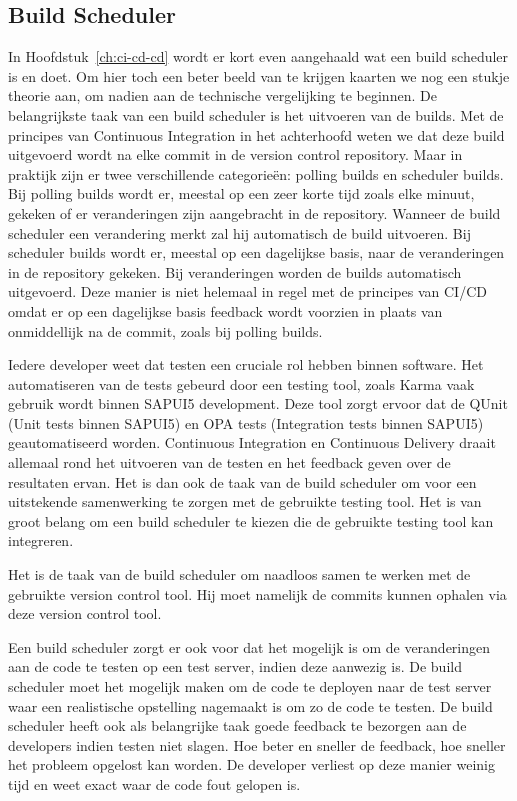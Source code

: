         \subsection{Build Scheduler}
        \label{subsec:build-scheduler}
        In Hoofdstuk~\ref{ch:ci-cd-cd} wordt er kort even aangehaald wat een build scheduler is en doet. Om hier toch een beter beeld van te krijgen kaarten we nog een stukje theorie aan, om nadien aan de technische vergelijking te beginnen.
        De belangrijkste taak van een build scheduler is het uitvoeren van de builds. Met de principes van Continuous Integration in het achterhoofd weten we dat deze build uitgevoerd wordt na elke commit in de version control repository. Maar in praktijk zijn er twee verschillende categorieën: polling builds en scheduler builds. 
        Bij polling builds wordt er, meestal op een zeer korte tijd zoals elke minuut, gekeken of er veranderingen zijn aangebracht in de repository. Wanneer de build scheduler een verandering merkt zal hij automatisch de build uitvoeren.
        Bij scheduler builds wordt er, meestal op een dagelijkse basis, naar de veranderingen in de repository gekeken. Bij veranderingen worden de builds automatisch uitgevoerd. Deze manier is niet helemaal in regel met de principes van CI/CD omdat er op een dagelijkse basis feedback wordt voorzien in plaats van onmiddellijk na de commit, zoals bij polling builds.
        
        Iedere developer weet dat testen een cruciale rol hebben binnen software. Het automatiseren van de tests gebeurd door een testing tool, zoals Karma vaak gebruik wordt binnen SAPUI5 development. Deze tool zorgt ervoor dat de QUnit (Unit tests binnen SAPUI5) en OPA tests (Integration tests binnen SAPUI5) geautomatiseerd worden. Continuous Integration en Continuous Delivery draait allemaal rond het uitvoeren van de testen en het feedback geven over de resultaten ervan. Het is dan ook de taak van de build scheduler om voor een uitstekende samenwerking te zorgen met de gebruikte testing tool. Het is van groot belang om een build scheduler te kiezen die de gebruikte testing tool kan integreren.
        
        Het is de taak van de build scheduler om naadloos samen te werken met de gebruikte version control tool. Hij moet namelijk de commits kunnen ophalen via deze version control tool.
        
        Een build scheduler zorgt er ook voor dat het mogelijk is om de veranderingen aan de code te testen op een test server, indien deze aanwezig is. De build scheduler moet het mogelijk maken om de code te deployen naar de test server waar een realistische opstelling nagemaakt is om zo de code te testen.
        De build scheduler heeft ook als belangrijke taak goede feedback te bezorgen aan de developers indien testen niet slagen. Hoe beter en sneller de feedback, hoe sneller het probleem opgelost kan worden. De developer verliest op deze manier weinig tijd en weet exact waar de code fout gelopen is.
        
